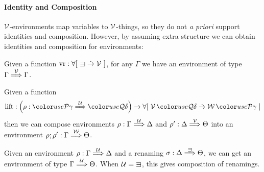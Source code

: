 
\paragraph{Identity and Composition} $\mathcal V$-environments map variables
to $\mathcal V$-things, so they do not {\it a priori} support identities and
composition. However, by assuming extra structure we can obtain
identities and composition for environments:

\begin{lemma}\label{thm:env-id}
  Given a function $\mathrm{vr} : \forallb{{\sqni} \dotto \V}$, for any
  $\Gamma$ we have an environment of type $\Gamma \stackrel{\mathcal V}\Longrightarrow \Gamma$.
\end{lemma}

\begin{lemma}\label{thm:env-comp}
  Given a function
  \begin{displaymath}
    \mathrm{lift} : \plr{\rho : \grP\gamma \env\U \grQ\delta} \to \forallb{\V\,\grQ\delta \dotto \W\,\grP\gamma}
  \end{displaymath}
  then we can compose environments $\rho : \Gamma \stackrel{\mathcal U}\Longrightarrow \Delta$ and
  $\rho' : \Delta \stackrel{\mathcal V}\Longrightarrow \Theta$ into an environment
  $\rho; \rho' : \Gamma \stackrel{\mathcal W}\Longrightarrow \Theta$.
\end{lemma}

\begin{corollary}\label{thm:env-postren}
  Given an environment $\rho : \Gamma \stackrel{\mathcal U}\Longrightarrow \Delta$ and a renaming
  $\sigma : \Delta \env\sqni \Theta$, we can get an environment of type
  $\Gamma \stackrel{\mathcal U}\Longrightarrow \Theta$.
  When $\U = {\sqni}$, this gives composition of renamings.
\end{corollary}

